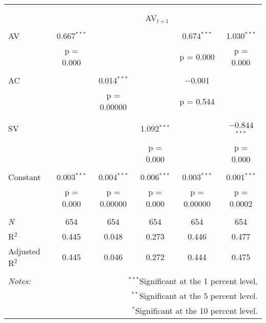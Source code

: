 
\begin{tabular}{@{\extracolsep{5pt}}lccccc} 
\\[-1.8ex]\hline 
\hline \\[-1.8ex] 
\\[-1.8ex] & \multicolumn{5}{c}{AV$_{t+1}$} \\ 
\hline \\[-1.8ex] 
 AV & 0.667$^{***}$ &  &  & 0.674$^{***}$ & 1.030$^{***}$ \\ 
  & p = 0.000 &  &  & p = 0.000 & p = 0.000 \\ 
  & & & & & \\ 
 AC &  & 0.014$^{***}$ &  & $-$0.001 &  \\ 
  &  & p = 0.00000 &  & p = 0.544 &  \\ 
  & & & & & \\ 
 SV &  &  & 1.092$^{***}$ &  & $-$0.844$^{***}$ \\ 
  &  &  & p = 0.000 &  & p = 0.000 \\ 
  & & & & & \\ 
 Constant & 0.003$^{***}$ & 0.004$^{***}$ & 0.006$^{***}$ & 0.003$^{***}$ & 0.001$^{***}$ \\ 
  & p = 0.000 & p = 0.00000 & p = 0.000 & p = 0.00000 & p = 0.0002 \\ 
  & & & & & \\ 
\textit{N} & 654 & 654 & 654 & 654 & 654 \\ 
R$^{2}$ & 0.445 & 0.048 & 0.273 & 0.446 & 0.477 \\ 
Adjusted R$^{2}$ & 0.445 & 0.046 & 0.272 & 0.444 & 0.475 \\ 
\hline 
\hline \\[-1.8ex] 
\textit{Notes:} & \multicolumn{5}{r}{$^{***}$Significant at the 1 percent level.} \\ 
 & \multicolumn{5}{r}{$^{**}$Significant at the 5 percent level.} \\ 
 & \multicolumn{5}{r}{$^{*}$Significant at the 10 percent level.} \\ 
\end{tabular} 

